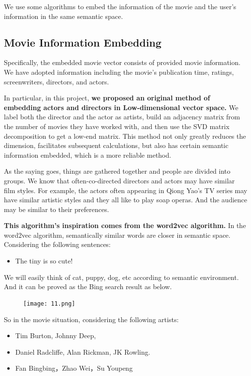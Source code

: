 \documentclass[11pt,a4paper]{article}
\begin{document}
We use some algorithms to embed the information of the movie and the
user's information in the same semantic space.

\hypertarget{header-n77}{%
\subsection{Movie Information Embedding}\label{header-n77}}

Specifically, the embedded movie vector consists of provided movie
information. We have adopted information including the movie's
publication time, ratings, screenwriters, directors, and actors.

In particular, in this project, \textbf{we proposed an original method
of embedding actors and directors in Low-dimensional vector space.} We
label both the director and the actor as artists, build an adjacency
matrix from the number of movies they have worked with, and then use the
SVD matrix decomposition to get a low-end matrix. This method not only
greatly reduces the dimension, facilitates subsequent calculations, but
also has certain semantic information embedded, which is a more reliable
method.

As the saying goes, things are gathered together and people are divided
into groups. We know that often-co-directed directors and actors may
have similar film styles. For example, the actors often appearing in
Qiong Yao's TV series may have similar artistic styles and they all like
to play soap operas. And the audience may be similar to their
preferences.

\textbf{This algorithm's inspiration comes from the word2vec algorithm.}
In the word2vec algorithm, semantically similar words are closer in
semantic space. Considering the following sentences:

\begin{itemize}
\item
  The tiny \textbf{} is so cute!
\end{itemize}

We will easily think of cat, puppy, dog, etc according to semantic
environment. And it can be proved as the Bing search result as below.

\begin{figure}
\centering
\texttt{[image: 11.png]}
\caption{}
\end{figure}

So in the movie situation, considering the following artists:

\begin{itemize}
\item
  Tim Burton, Johnny Deep,
\item
  Daniel Radcliffe, Alan Rickman, JK Rowling.
\item
  Fan Bingbing，Zhao Wei，Su Youpeng
\end{itemize}
\end{document}
